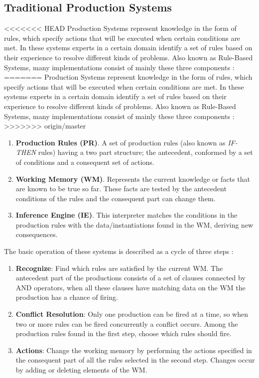 \subsection{Traditional Production Systems}
<<<<<<< HEAD
Production Systems represent knowledge in the form of rules, which 
specify actions that will be executed when certain conditions are met. 
In these systems experts in a certain domain identify a set of rules 
based on their experience to  resolve different kinds of problems. 
Also known as Rule-Based Systems, many implementations consist 
of mainly these three components  
\cite{brachman1992knowledge}  \cite{konar2006computational}:
=======
Production Systems represent knowledge in the form of rules, which specify
actions that will be executed when certain conditions are met. In these 
systems experts in a certain domain identify a set of rules based 
on their experience to 
resolve different kinds of problems. Also known as Rule-Based Systems,
many implementations consist of mainly these three
components \cite{brachman1992knowledge} \cite{konar2006computational}:
>>>>>>> origin/master
\begin{enumerate}   
\item \textbf{Production Rules (PR)}. A set of
production rules (also known as \textit{IF-THEN} rules) having a two part
structure; the antecedent, conformed by a set of conditions and a
consequent set of actions. 
\item \textbf{Working Memory (WM)}.
Represents the current knowledge or facts that are known to be true so
far. These facts are tested by the antecedent conditions of the rules
and the consequent part can change them. 
\item \textbf{Inference Engine (IE)}. 
This interpreter matches the conditions in the
production rules with the data/instantiations found in the WM,
deriving new consequences.
\end{enumerate}
The basic operation of these systems is described as a cycle of 
three steps  \cite{brachman1992knowledge}:
\begin{enumerate}
\item \textbf{Recognize}: Find which rules are satisfied by 
the current WM. The antecedent part of the productions consists 
of a set of clauses connected by AND operators, when all these 
clauses have matching data on the WM the production has a chance 
of firing.
\item \textbf{Conflict Resolution}: Only one production can be 
fired at a time, so when two or more rules can be fired concurrently 
a conflict occurs. Among the production rules found in the first 
step, choose which rules should fire.
\item \textbf{Actions}: Change the working memory by performing 
the actions specified in the consequent part of all the rules 
selected in the second step. Changes occur by adding or 
deleting elements of the WM.
\end{enumerate}
